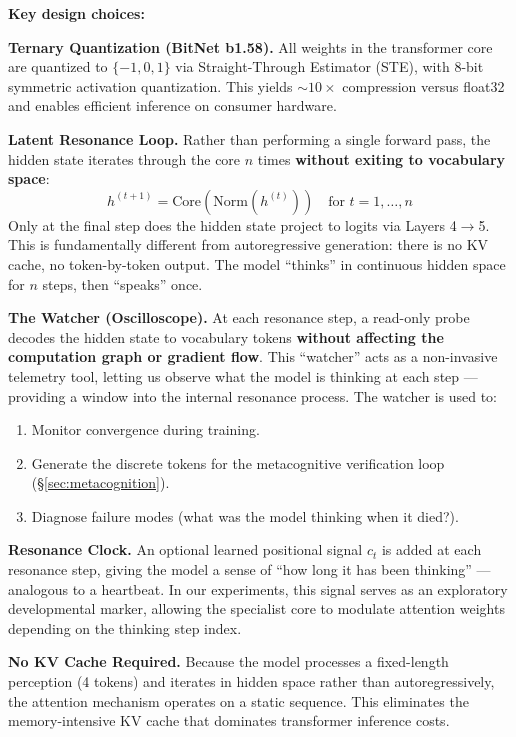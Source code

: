 \documentclass{article}
\begin{document}
\textbf{Key design choices:}

\textbf{Ternary Quantization (BitNet b1.58).} All weights in the transformer core are quantized to $\{-1, 0, 1\}$ via Straight-Through Estimator (STE), with 8-bit symmetric activation quantization. This yields $\sim 10\times$ compression versus float32 and enables efficient inference on consumer hardware.

\textbf{Latent Resonance Loop.} Rather than performing a single forward pass, the hidden state iterates through the core $n$ times \textbf{without exiting to vocabulary space}:
\begin{equation}
h^{(t+1)} = \text{Core}(\text{Norm}(h^{(t)})) \quad \text{for } t = 1, \dots, n
\end{equation}
Only at the final step does the hidden state project to logits via Layers 4$\rightarrow$5. This is fundamentally different from autoregressive generation: there is no KV cache, no token-by-token output. The model ``thinks'' in continuous hidden space for $n$ steps, then ``speaks'' once.

\textbf{The Watcher (Oscilloscope).} At each resonance step, a read-only probe decodes the hidden state to vocabulary tokens \textbf{without affecting the computation graph or gradient flow}. This ``watcher'' acts as a non-invasive telemetry tool, letting us observe what the model is thinking at each step --- providing a window into the internal resonance process. The watcher is used to:
\begin{enumerate}
    \item Monitor convergence during training.
    \item Generate the discrete tokens for the metacognitive verification loop (\S\ref{sec:metacognition}).
    \item Diagnose failure modes (what was the model thinking when it died?).
\end{enumerate}

\textbf{Resonance Clock.} An optional learned positional signal $c_t$ is added at each resonance step, giving the model a sense of ``how long it has been thinking'' --- analogous to a heartbeat. In our experiments, this signal serves as an exploratory developmental marker, allowing the specialist core to modulate attention weights depending on the thinking step index.

\textbf{No KV Cache Required.} Because the model processes a fixed-length perception (4 tokens) and iterates in hidden space rather than autoregressively, the attention mechanism operates on a static sequence. This eliminates the memory-intensive KV cache that dominates transformer inference costs.
\end{document}
